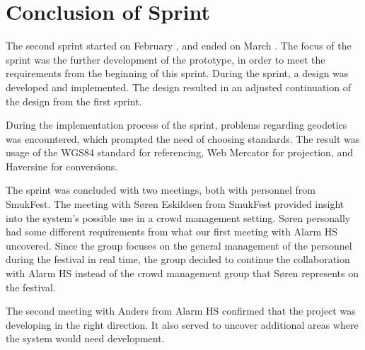 \section{Conclusion of Sprint}
The second sprint started on February , and ended on March . The focus of the sprint was the further development of the prototype, in order to meet the requirements from the beginning of this sprint. During the sprint, a design was developed and implemented. The design resulted in an adjusted continuation of the design from the first sprint.

During the implementation process of the sprint, problems regarding geodetics was encountered, which prompted the need of choosing standards. The result was usage of the WGS84 standard for referencing, Web Mercator for projection, and Haversine for conversions.

The sprint was concluded with two meetings, both with personnel from SmukFest. The meeting with Søren Eskildsen from SmukFest provided insight into the system's possible use in a crowd management setting. Søren personally had some different requirements from what our first meeting with Alarm HS uncovered. Since the group focuses on the general management of the personnel during the festival in real time, the group decided to continue the collaboration with Alarm HS instead of the crowd management group that Søren represents on the festival.

The second meeting with Anders from Alarm HS confirmed that the project was developing in the right direction. It also served to uncover additional areas where the system would need development.